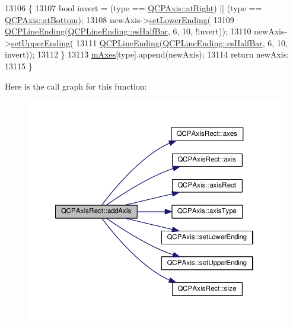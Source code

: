\begin{DoxyCode}
13106   \{
13107     \textcolor{keywordtype}{bool} invert = (type == \hyperlink{class_q_c_p_axis_ae2bcc1728b382f10f064612b368bc18aadf5509f7d29199ef2f263b1dd224b345}{QCPAxis::atRight}) || (type == 
      \hyperlink{class_q_c_p_axis_ae2bcc1728b382f10f064612b368bc18aa220d68888516b6c3b493d144f1ba438f}{QCPAxis::atBottom});
13108     newAxis->\hyperlink{class_q_c_p_axis_a08af1c72db9ae4dc8cb8a973d44405ab}{setLowerEnding}(
13109         \hyperlink{class_q_c_p_line_ending}{QCPLineEnding}(\hyperlink{class_q_c_p_line_ending_a5ef16e6876b4b74959c7261d8d4c2cd5a126c390f0c359fcd8df1fc5e38d26d5b}{QCPLineEnding::esHalfBar}, 6, 10, !invert));
13110     newAxis->\hyperlink{class_q_c_p_axis_a69119b892fc306f651763596685aa377}{setUpperEnding}(
13111         \hyperlink{class_q_c_p_line_ending}{QCPLineEnding}(\hyperlink{class_q_c_p_line_ending_a5ef16e6876b4b74959c7261d8d4c2cd5a126c390f0c359fcd8df1fc5e38d26d5b}{QCPLineEnding::esHalfBar}, 6, 10, invert));
13112   \}
13113   \hyperlink{class_q_c_p_axis_rect_ac2cb3ba9a25b733883afc3bd25f7d82b}{mAxes}[type].append(newAxis);
13114   \textcolor{keywordflow}{return} newAxis;
13115 \}
\end{DoxyCode}


Here is the call graph for this function\+:\nopagebreak
\begin{figure}[H]
\begin{center}
\leavevmode
\includegraphics[width=350pt]{class_q_c_p_axis_rect_a2dc336092ccc57d44a46194c8a23e4f4_cgraph}
\end{center}
\end{figure}




